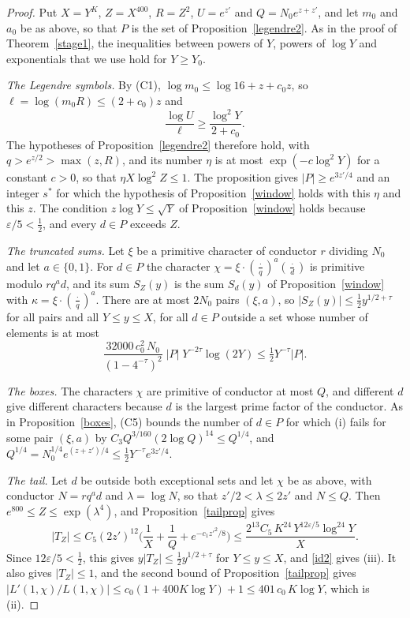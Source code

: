 \documentclass[11pt,letterpaper]{article}
\numberwithin{equation}{section}
\begin{document}
\begin{proof}
Put $X=Y^K$, $Z=X^{400}$, $R=Z^2$, $U=e^{z'}$ and $Q=N_0e^{z+z'}$, and let $m_0$ and $a_0$ be as above, so that $P$ is the set of Proposition~\ref{legendre2}. As in the proof of Theorem~\ref{stage1}, the inequalities between powers of $Y$, powers of $\log Y$ and exponentials that we use hold for $Y\ge Y_0$.

\emph{The Legendre symbols.} By (C1), $\log m_0\le\log16+z+c_0z$, so $\ell=\log(m_0R)\le(2+c_0)z$ and
\[
\frac{\log U}{\ell}\ge\frac{\log^2Y}{2+c_0}.
\]
The hypotheses of Proposition~\ref{legendre2} therefore hold, with $q>e^{z/2}>\max(z,R)$, and its number $\eta$ is at most $\exp(-c\log^2Y)$ for a constant $c>0$, so that $\eta X\log^2Z\le1$. The proposition gives $|P|\ge e^{3z'/4}$ and an integer $s^\ast$ for which the hypothesis of Proposition~\ref{window} holds with this $\eta$ and this $z$. The condition $z\log Y\le\sqrt Y$ of Proposition~\ref{window} holds because $\varepsilon/5<\tfrac12$, and every $d\in P$ exceeds $Z$.

\emph{The truncated sums.} Let $\xi$ be a primitive character of conductor $r$ dividing $N_0$ and let $a\in\{0,1\}$. For $d\in P$ the character $\chi=\xi\cdot(\tfrac{\cdot}{q})^a(\tfrac{\cdot}{d})$ is primitive modulo $rq^ad$, and its sum $S_Z(y)$ is the sum $S_d(y)$ of Proposition~\ref{window} with $\kappa=\xi\cdot(\tfrac{\cdot}{q})^a$. There are at most $2N_0$ pairs $(\xi,a)$, so $|S_Z(y)|\le\tfrac12y^{1/2+\tau}$ for all pairs and all $Y\le y\le X$, for all $d\in P$ outside a set whose number of elements is at most
\[
\frac{32000\,c_0^2\,N_0}{(1-4^{-\tau})^2}\;|P|\;Y^{-2\tau}\log(2Y)\le\tfrac12Y^{-\tau}|P| .
\]

\emph{The boxes.} The characters $\chi$ are primitive of conductor at most $Q$, and different $d$ give different characters because $d$ is the largest prime factor of the conductor. As in Proposition~\ref{boxes}, (C5) bounds the number of $d\in P$ for which (i) fails for some pair $(\xi,a)$ by $C_3Q^{3/160}(2\log Q)^{14}\le Q^{1/4}$, and $Q^{1/4}=N_0^{1/4}e^{(z+z')/4}\le\tfrac12Y^{-\tau}e^{3z'/4}$.

\emph{The tail.} Let $d$ be outside both exceptional sets and let $\chi$ be as above, with conductor $N=rq^ad$ and $\lambda=\log N$, so that $z'/2<\lambda\le2z'$ and $N\le Q$. Then $e^{800}\le Z\le\exp(\lambda^4)$, and Proposition~\ref{tailprop} gives
\[
|T_Z|\le C_5(2z')^{12}\Big(\frac1X+\frac1Q+e^{-c_1z'^2/8}\Big)\le\frac{2^{13}C_5\,K^{24}\,Y^{12\varepsilon/5}\log^{24}Y}X .
\]
Since $12\varepsilon/5<\tfrac12$, this gives $y|T_Z|\le\tfrac12y^{1/2+\tau}$ for $Y\le y\le X$, and \eqref{id2} gives (iii). It also gives $|T_Z|\le1$, and the second bound of Proposition~\ref{tailprop} gives $|L'(1,\chi)/L(1,\chi)|\le c_0(1+400K\log Y)+1\le401\,c_0\,K\log Y$, which is (ii).
\end{proof}
\end{document}
